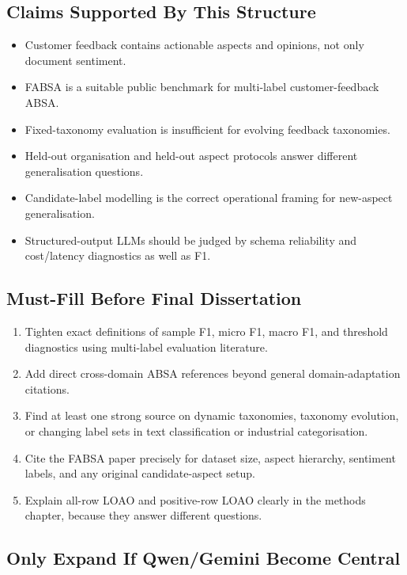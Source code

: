\subsection*{Claims Supported By This Structure}

\begin{itemize}
  \item Customer feedback contains actionable aspects and opinions, not only document sentiment.
  \item FABSA is a suitable public benchmark for multi-label customer-feedback ABSA.
  \item Fixed-taxonomy evaluation is insufficient for evolving feedback taxonomies.
  \item Held-out organisation and held-out aspect protocols answer different generalisation questions.
  \item Candidate-label modelling is the correct operational framing for new-aspect generalisation.
  \item Structured-output LLMs should be judged by schema reliability and cost/latency diagnostics as well as F1.
\end{itemize}

\subsection*{Must-Fill Before Final Dissertation}

\begin{enumerate}
  \item Tighten exact definitions of sample F1, micro F1, macro F1, and threshold diagnostics using multi-label evaluation literature.
  \item Add direct cross-domain ABSA references beyond general domain-adaptation citations.
  \item Find at least one strong source on dynamic taxonomies, taxonomy evolution, or changing label sets in text classification or industrial categorisation.
  \item Cite the FABSA paper precisely for dataset size, aspect hierarchy, sentiment labels, and any original candidate-aspect setup.
  \item Explain all-row LOAO and positive-row LOAO clearly in the methods chapter, because they answer different questions.
\end{enumerate}

\subsection*{Only Expand If Qwen/Gemini Become Central}

